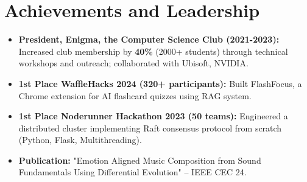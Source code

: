\documentclass[a4paper,11pt]{article}
\newcommand{\resumeItem}[1]{
  \item\small{#1}
}
\newcommand{\resumeItemListStart}{\begin{itemize}[rightmargin=0.11in]}
\newcommand{\resumeItemListEnd}{\end{itemize}}
\begin{document}
\section{Achievements and Leadership}
  \resumeItemListStart{}
    \resumeItem{\textbf{President, Enigma, the Computer Science Club (2021-2023):} Increased club membership by \textbf{40\%} (2000+ students) through technical workshops and outreach; collaborated with Ubisoft, NVIDIA.}
    \resumeItem{\textbf{1st Place WaffleHacks 2024 (320+ participants):} Built FlashFocus, a Chrome extension for AI flashcard quizzes using RAG system.}
    \resumeItem{\textbf{1st Place Noderunner Hackathon 2023 (50 teams):} Engineered a distributed cluster implementing Raft consensus protocol from scratch (Python, Flask, Multithreading).}
    \resumeItem{\textbf{Publication:} "Emotion Aligned Music Composition from Sound Fundamentals Using Differential Evolution" -- IEEE CEC 24.}
  \resumeItemListEnd{}
\end{document}
